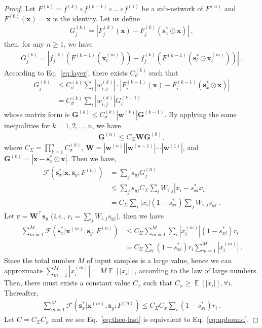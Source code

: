\documentclass[10pt,twocolumn,letterpaper]{article}
\def\mb{\mathbf}
\def\ie{\emph{i.e.}}
\begin{document}
\begin{proof}Let $F^{(k)}=f^{(k)}\circ f^{(k-1)}\circ\dots\circ f^{(1)}$ be a sub-network of $F^{(n)}$ and $F^{(0)}(\mb x)=\mb x$ is the identity. Let us define
\begin{align}
G^{(k)}_j=|F_{j}^{(k)}(\mb x)-F_{j}^{(k)}(\mb s^*_x\odot\mb x)|~,\nonumber
\end{align}
then, for any $n\ge 1$, we have
\begin{align}
    G^{(k)}_j=|f^{(k)}_j(F^{(k-1)}(\mb x^{(m)}_l))-f^{(k)}_j(F^{(k-1)}(\mb s^*_l\odot\mb x^{(m)}_l))|\nonumber~.
    \end{align}
    According to Eq.~\ref{eq:layer}, there exists $C_\sigma^{(k)}$ such that
    \begin{align}
    G^{(k)}_j
    &\le C_\sigma^{(k)}\sum_{i}|w_{i,j}^{(k)}|\cdot|F^{(k-1)}_{i}(\mb x)-F_{i}^{(k-1)}(\mb s^*_x\odot\mb x)|\nonumber\\
    &= C_\sigma^{(k)}\sum_{i}|w_{i,j}^{(k)}|G^{(k-1)}_i\nonumber
\end{align}
whose matrix form is
$\mb G^{(k)}\le C_\sigma^{(k)}|\mb w^{(k)}|\mb G^{(k-1)}$.
By applying the same inequalities for $k=1,2,\ldots,n$, we have
\begin{align}
\mb G^{(n)}\le C_\Sigma\mb W\mb G^{(0)},\nonumber
\end{align}
where $C_\Sigma=\prod_{k=1}^n C_\sigma^{(k)}$, $\mb W=|\mb w^{(n)}||\mb w^{(n-1)}|\cdots|\mb w^{(1)}|$, and $\mb G^{(0)}=|\mb x - \mb s^*_x\odot\mb x|$. Then we have,
\begin{align}
\mathcal{F}(\mb s^*_x|\mb x, \mb s_y; F^{(n)})&=\sum_j s_{yj}G_j^{(n)}\nonumber\\
&\le \sum_j s_{yj}C_\Sigma\sum_iW_{i,j}|x_i - s^*_{xi}x_i|\nonumber\\
&= C_\Sigma\sum_i |x_i|(1-s^*_{xi})\sum_j W_{i,j}s_{yj}\nonumber~.
\end{align}
Let $\mb r=\mb W^\intercal \mb s_y$ (\ie, $r_i=\sum_j W_{i,j}s_{yj}$), then we have
\begin{align}
\sum_{m=1}^M\mathcal{F}(\mb s^*_x|\mb x^{(m)}, \mb s_y; F^{(n)})&\le C_\Sigma\sum_{m=1}^M\sum_i |x_i^{(m)}|(1-s^*_{xi})r_{i}\nonumber\\
&=C_\Sigma\sum_i(1-s^*_{xi})r_i\sum_{m=1}^M|x_i^{(m)}|\nonumber~.
\end{align}
Since the total number $M$ of input samples is a large value, hence we can approximate  $\sum_{m=1}^M|x_i^{(m)}|=M\mathop{\mathbb{E}}[|x_i|]$,  according to the law of large numbers. Then, there must exists a constant value $C_x$ such that $C_x\ge \mathop{\mathbb{E}}[|x_i|], \forall i$. Thereafter,
\begin{align}
\sum_{m=1}^M\mathcal{F}(\mb s^*_x|\mb x^{(m)}, \mb s_y; F^{(n)})\le C_\Sigma C_x\sum_i(1-s^*_{xi})r_i~.\label{eq:theo-last}
\end{align}
Let $C=C_\Sigma C_x$ and we see Eq.~\ref{eq:theo-last} is equivalent to Eq.~\ref{eq:upbound}.
\end{proof}
\end{document}
